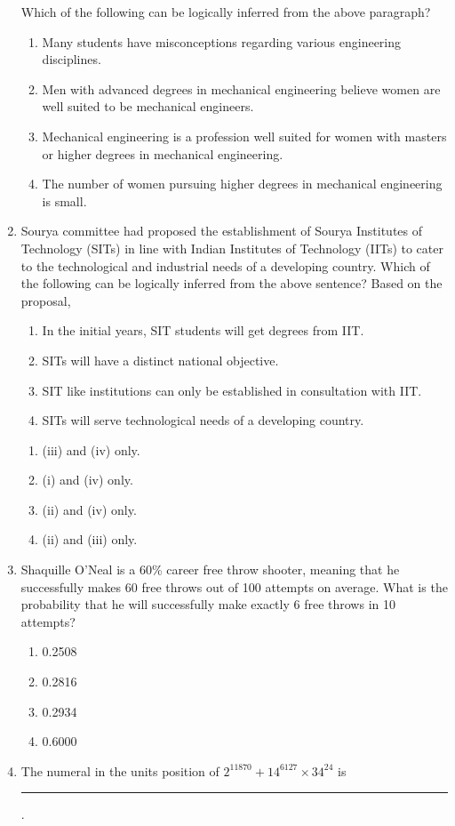 \documentclass[journal,12pt,onecolumn]{IEEEtran}
\begin{document}
\begin{enumerate}[label=\arabic*.]
Which of the following can be logically inferred from the above paragraph?
\begin{enumerate}[label=(\Alph*)]
\item Many students have misconceptions regarding various engineering disciplines.
\item Men with advanced degrees in mechanical engineering believe women are well suited to be mechanical engineers.
\item Mechanical engineering is a profession well suited for women with masters or higher degrees in mechanical engineering.
\item The number of women pursuing higher degrees in mechanical engineering is small.
\end{enumerate}

\item Sourya committee had proposed the establishment of Sourya Institutes of Technology (SITs) in line with Indian Institutes of Technology (IITs) to cater to the technological and industrial needs of a developing country.
Which of the following can be logically inferred from the above sentence?
Based on the proposal,
\begin{enumerate}[label=(\roman*)]
\item In the initial years, SIT students will get degrees from IIT.
\item SITs will have a distinct national objective.
\item SIT like institutions can only be established in consultation with IIT.
\item SITs will serve technological needs of a developing country.
\end{enumerate}
\vspace{-2ex}
\begin{multicols}{2}
\begin{enumerate}[label=(\Alph*)]
\item (iii) and (iv) only.
\item (i) and (iv) only.
\item (ii) and (iv) only.
\item (ii) and (iii) only.
\end{enumerate}
\end{multicols}

\item Shaquille O’Neal is a 60\% career free throw shooter, meaning that he successfully makes 60 free throws out of 100 attempts on average. What is the probability that he will successfully make exactly 6 free throws in 10 attempts?
\begin{multicols}{4}
\begin{enumerate}[label=(\Alph*)]
\item 0.2508
\item 0.2816
\item 0.2934
\item 0.6000
\end{enumerate}
\end{multicols}

\item The numeral in the units position of $2^{11870} + 14^{6127}\times34^{24}$ is \rule{2.5cm}{0.1pt}.
\end{enumerate}
\end{document}
